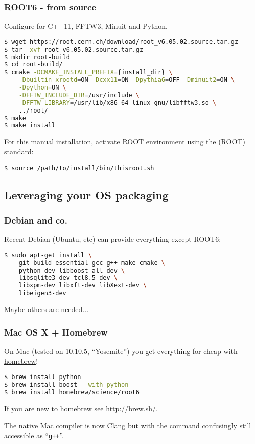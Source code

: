 \documentclass[xcolor=dvipsnames]{beamer}
\begin{document}
\begin{frame}[fragile]
  \frametitle{ROOT6 - from source}
  Configure for C++11, FFTW3, Minuit and Python.

\scriptsize
\begin{lstlisting}[language=sh]
$ wget https://root.cern.ch/download/root_v6.05.02.source.tar.gz
$ tar -xvf root_v6.05.02.source.tar.gz
$ mkdir root-build
$ cd root-build/
$ cmake -DCMAKE_INSTALL_PREFIX={install_dir} \
	-Dbuiltin_xrootd=ON -Dcxx11=ON -Dpythia6=OFF -Dminuit2=ON \
	-Dpython=ON \
	-DFFTW_INCLUDE_DIR=/usr/include \
	-DFFTW_LIBRARY=/usr/lib/x86_64-linux-gnu/libfftw3.so \
	../root/
$ make
$ make install
\end{lstlisting}

\small
For this manual installation, activate ROOT environment using the (ROOT) standard:

\begin{verbatim}
$ source /path/to/install/bin/thisroot.sh
\end{verbatim}

\end{frame}

\subsection{Leveraging your OS packaging}

\begin{frame}[fragile]
  \frametitle{Debian and co.}

  Recent Debian (Ubuntu, etc) can provide everything except ROOT6:
\begin{lstlisting}[language=sh]
$ sudo apt-get install \
    git build-essential gcc g++ make cmake \
    python-dev libboost-all-dev \
    libsqlite3-dev tcl8.5-dev \
    libxpm-dev libxft-dev libXext-dev \
    libeigen3-dev
\end{lstlisting}
  Maybe others are needed...
\end{frame}

\begin{frame}[fragile]
  \frametitle{Mac OS X + Homebrew}
  On Mac (tested on 10.10.5, ``Yosemite'') you get everything for cheap with \href{http://brew.sh/}{homebrew}!
\begin{lstlisting}[language=sh]
$ brew install python
$ brew install boost --with-python
$ brew install homebrew/science/root6
\end{lstlisting}
  If you are new to homebrew see \url{http://brew.sh/}.

  The native Mac compiler is now Clang but with the command confusingly still accessible as ``\texttt{g++}''.


\end{frame}
\end{document}
